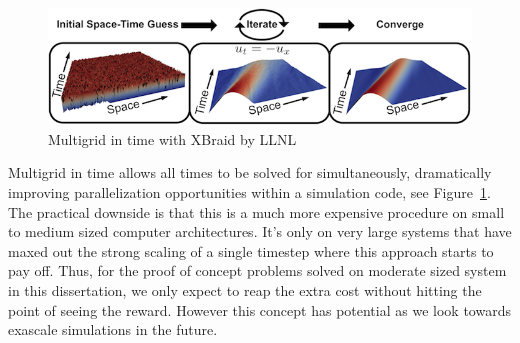 \documentclass[Dissertation.tex]{subfiles}
\begin{document}
\begin{figure}[!ht]
\centering
\includegraphics[width=1.0\textwidth]{Schematics/XBraid}
\caption{Multigrid in time with XBraid by LLNL\cite{XBraid}}
\label{fig:xbraid}
\end{figure}

Multigrid in time allows all times to be solved for simultaneously, dramatically improving parallelization opportunities within a
simulation code, see Figure~\ref{fig:xbraid}.
The practical downside is that this is a much more expensive procedure on small to medium sized computer architectures.
It's only on very large systems that have maxed out the strong scaling of a single timestep where this approach starts to pay off.
Thus, for the proof of concept problems solved on moderate sized system in this dissertation, we only expect to reap the extra cost
without hitting the point of seeing the reward.
However this concept has potential as we look towards exascale simulations in the future.
\end{document}
